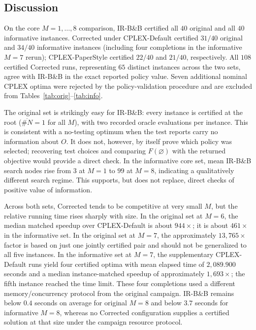 \documentclass[11pt,a4paper]{article}
\begin{document}
\subsection{Discussion}\label{sec:discussion}
On the core $M=1,\ldots,8$ comparison, IR-B\&B certified all $40$ original and all $40$ informative instances. Corrected under CPLEX-Default certified $31/40$ original and $34/40$ informative instances (including four completions in the informative $M=7$ rerun); CPLEX-PaperStyle certified $22/40$ and $21/40$, respectively. All $108$ certified Corrected runs, representing $65$ distinct instances across the two sets, agree with IR-B\&B in the exact reported policy value. Seven additional nominal CPLEX optima were rejected by the policy-validation procedure and are excluded from Tables~\ref{tab:orig}--\ref{tab:info}.

The original set is strikingly easy for IR-B\&B: every instance is certified at the root ($\overline{\#N}=1$ for all $M$), with two recorded oracle evaluations per instance. This is consistent with a no-testing optimum when the test reports carry no information about $O$. It does not, however, by itself prove which policy was selected; recovering test choices and comparing $F(\varnothing)$ with the returned objective would provide a direct check. In the informative core set, mean IR-B\&B search nodes rise from $3$ at $M=1$ to $99$ at $M=8$, indicating a qualitatively different search regime. This supports, but does not replace, direct checks of positive value of information.

Across both sets, Corrected tends to be competitive at very small $M$, but the relative running time rises sharply with size. In the original set at $M=6$, the median matched speedup over CPLEX-Default is about $944\times$; it is about $461\times$ in the informative set. In the original set at $M=7$, the approximately $13{,}765\times$ factor is based on just one jointly certified pair and should not be generalized to all five instances. In the informative set at $M=7$, the supplementary CPLEX-Default runs yield four certified optima with mean elapsed time of $2{,}089.900$ seconds and a median instance-matched speedup of approximately $1{,}693\times$; the fifth instance reached the time limit. These four completions used a different memory/concurrency protocol from the original campaign. IR-B\&B remains below $0.4$ seconds on average for original $M=8$ and below $3.7$ seconds for informative $M=8$, whereas no Corrected configuration supplies a certified solution at that size under the campaign resource protocol.
\end{document}

